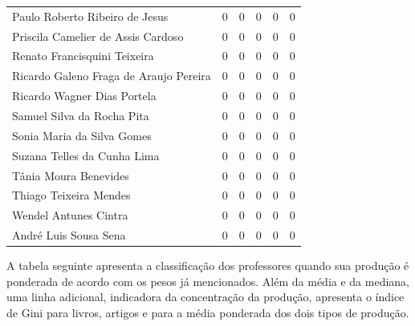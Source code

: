 \documentclass[12pt,brazil]{article}\usepackage[]{graphicx}\usepackage[]{xcolor}
\newcounter{tabela}
\begin{document}
\begin{longtable}{lrrrrr}
Paulo Roberto Ribeiro de Jesus & 0 & 0 & 0 & 0 & 0 \\
Priscila Camelier de Assis Cardoso & 0 & 0 & 0 & 0 & 0 \\
Renato Francisquini Teixeira & 0 & 0 & 0 & 0 & 0 \\
Ricardo Galeno Fraga de Araujo Pereira & 0 & 0 & 0 & 0 & 0 \\
Ricardo Wagner Dias Portela & 0 & 0 & 0 & 0 & 0 \\
Samuel Silva da Rocha Pita & 0 & 0 & 0 & 0 & 0 \\
Sonia Maria da Silva Gomes & 0 & 0 & 0 & 0 & 0 \\
Suzana Telles da Cunha Lima & 0 & 0 & 0 & 0 & 0 \\
Tânia Moura Benevides & 0 & 0 & 0 & 0 & 0 \\
Thiago Teixeira Mendes & 0 & 0 & 0 & 0 & 0 \\
\hline Wendel Antunes Cintra & 0 & 0 & 0 & 0 & 0 \\
André Luis Sousa Sena & 0 & 0 & 0 & 0 & 0 \\
\end{longtable}


\clearpage

A tabela seguinte apresenta a classificação dos professores quando sua
produção é ponderada de acordo com os pesos já mencionados. Além da média e da
mediana, uma linha adicional, indicadora da concentração da produção,
apresenta o índice de Gini para livros, artigos e para a média ponderada dos
dois tipos de produção.
\end{document}
